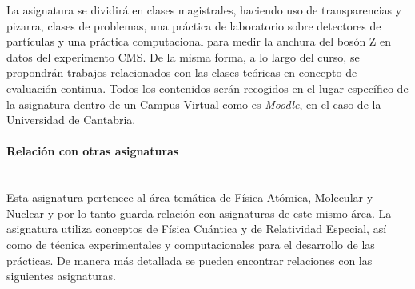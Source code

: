 La asignatura se dividirá en clases magistrales, haciendo uso de transparencias y pizarra, clases de problemas, una práctica de laboratorio sobre detectores de partículas y una práctica computacional para medir la anchura del bosón Z en datos del experimento CMS. De la misma forma, a lo largo del curso, se propondrán trabajos relacionados con las clases teóricas en concepto de evaluación continua. Todos los contenidos serán recogidos en el lugar específico de la asignatura dentro de un Campus Virtual como es \emph{Moodle}, en el caso de la Universidad de Cantabria.

\paragraph{Relación con otras asignaturas\\\\}

Esta asignatura pertenece al área temática de Física Atómica, Molecular y Nuclear y por lo tanto guarda relación con asignaturas de este mismo área. La asignatura utiliza conceptos de Física Cuántica y de Relatividad Especial, así como de técnica experimentales y computacionales para el desarrollo de las prácticas. De manera más detallada se pueden encontrar relaciones con las siguientes asignaturas.

